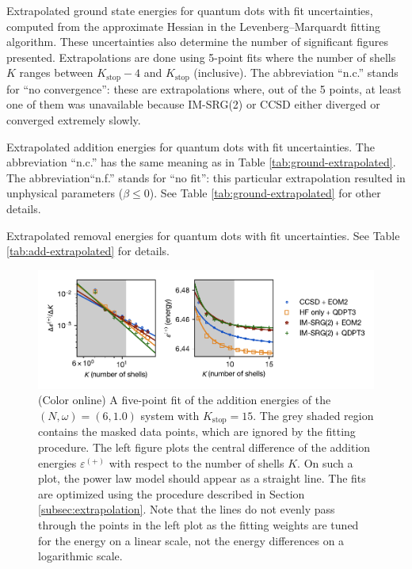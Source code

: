 \documentclass[aip, jcp, 12pt]{revtex4-1}
\begin{document}
\begin{table}
  \centering
  \caption{Extrapolated ground state energies for quantum dots with fit uncertainties, computed from the approximate Hessian in the Levenberg--Marquardt fitting algorithm.  These uncertainties also determine the number of significant figures presented.  Extrapolations are done using 5-point fits where the number of shells $K$ ranges between $K_{\text{stop}} - 4$ and $K_{\text{stop}}$ (inclusive).  The abbreviation ``n.c.'' stands for ``no convergence'': these are extrapolations where, out of the 5 points, at least one of them was unavailable because IM-SRG(2) or CCSD either diverged or converged extremely slowly.}
  \label{tab:ground-extrapolated}
  \unskip
\end{table}

\begin{table}
  \centering
  \caption{Extrapolated addition energies for quantum dots with fit uncertainties.  The abbreviation ``n.c.'' has the same meaning as in Table \ref{tab:ground-extrapolated}.  The abbreviation``n.f.'' stands for ``no fit'': this particular extrapolation resulted in unphysical parameters ($\beta \le 0$).  See Table \ref{tab:ground-extrapolated} for other details.}
  \label{tab:add-extrapolated}
  \unskip
\end{table}

\begin{table}
  \centering
  \caption{Extrapolated removal energies for quantum dots with fit uncertainties.  See Table \ref{tab:add-extrapolated} for details.}
  \label{tab:rm-extrapolated}
  \unskip
\end{table}

\begin{figure}
  \centering
  \includegraphics{fig-fit-2-1p0-add.pdf}
  \caption{(Color online) A five-point fit of the addition energies of the $(N, \omega) = (6, 1.0)$ system with $K_{\text{stop}} = 15$.  The grey shaded region contains the masked data points, which are ignored by the fitting procedure.  The left figure plots the central difference of the addition energies $\varepsilon^{(+)}$ with respect to the number of shells $K$.  On such a plot, the power law model should appear as a straight line.  The fits are optimized using the procedure described in Section \ref{subsec:extrapolation}.  Note that the lines do not evenly pass through the points in the left plot as the fitting weights are tuned for the energy on a linear scale, not the energy differences on a logarithmic scale.}
  \label{fig:by-fit-2-1p0-add}
\end{figure}
\end{document}

